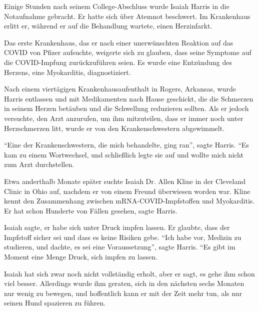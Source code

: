 Einige Stunden nach seinem College-Abschluss wurde Isaiah Harris in die
Notaufnahme gebracht. Er hatte sich über Atemnot beschwert. Im Krankenhaus
erlitt er, während er auf die Behandlung wartete, einen Herzinfarkt.

Das erste Krankenhaus, das er nach einer unerwünschten Reaktion auf das COVID
von Pfizer aufsuchte, weigerte sich zu glauben, dass seine Symptome auf die
COVID-Impfung zurückzuführen seien. Es wurde eine Entzündung des Herzens, eine
Myokarditis, diagnostiziert.

Nach einem viertägigen Krankenhausaufenthalt in Rogers, Arkansas, wurde Harris
entlassen und mit Medikamenten nach Hause geschickt, die die Schmerzen in seinem
Herzen betäuben und die Schwellung reduzieren sollten. Als er jedoch versuchte,
den Arzt anzurufen, um ihm mitzuteilen, dass er immer noch unter Herzschmerzen
litt, wurde er von den Krankenschwestern abgewimmelt.

``Eine der Krankenschwestern, die mich behandelte, ging ran'', sagte
Harris. ``Es kam zu einem Wortwechsel, und schließlich legte sie auf und wollte
mich nicht zum Arzt durchstellen.

Etwa anderthalb Monate später suchte Isaiah Dr. Allen Kline in der Cleveland
Clinic in Ohio auf, nachdem er von einem Freund überwiesen worden war. Kline
kennt den Zusammenhang zwischen mRNA-COVID-Impfstoffen und Myokarditis. Er hat
schon Hunderte von Fällen gesehen, sagte Harris.

Isaiah sagte, er habe sich unter Druck impfen lassen. Er glaubte, dass der
Impfstoff sicher sei und dass es keine Risiken gebe. ``Ich habe vor, Medizin zu
studieren, und dachte, es sei eine Voraussetzung'', sagte Harris. ``Es gibt im
Moment eine Menge Druck, sich impfen zu lassen.

Isaiah hat sich zwar noch nicht vollständig erholt, aber er sagt, es gehe ihm
schon viel besser. Allerdings wurde ihm geraten, sich in den nächsten sechs
Monaten nur wenig zu bewegen, und hoffentlich kann er mit der Zeit mehr tun, als
nur seinen Hund spazieren zu führen.
